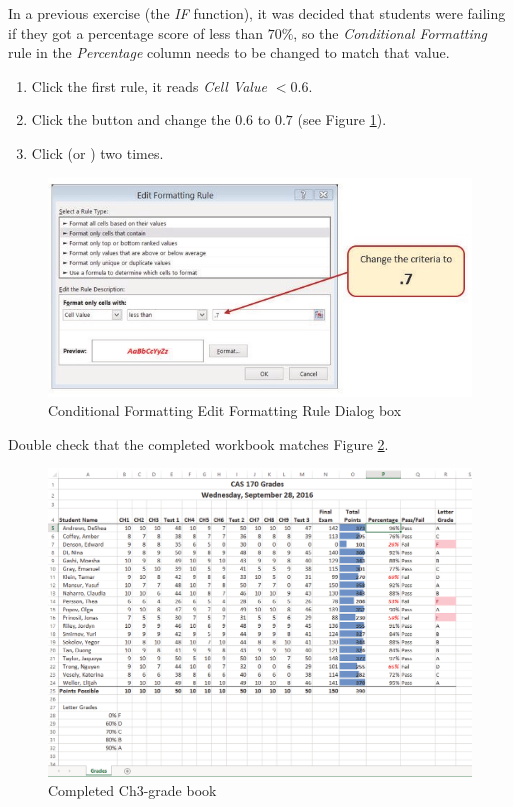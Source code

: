 In a previous exercise (the \textit{IF} function), it was decided that students were failing if they got a percentage score of less than $ 70\% $, so the \textit{Conditional Formatting} rule in the \textit{Percentage} column needs to be changed to match that value.

\begin{enumbox}
	\begin{enumerate}
		\item Click the first rule, it reads \textit{Cell Value $ <0.6 $}.
		\item Click the  button and change the $ 0.6 $ to $ 0.7 $ (see Figure \ref{03:fig24}).
		\item Click  (or ) two times.
	\end{enumerate}
\end{enumbox}
	
\begin{figure}[H]
	\centering
	\includegraphics[width=\maxwidth{.95\linewidth}]{gfx/ch03_fig24}
	\caption{Conditional Formatting Edit Formatting Rule Dialog box}
	\label{03:fig24}
\end{figure}

Double check that the completed workbook matches Figure \ref{03:fig25}.

\begin{figure}[H]
	\centering
	\includegraphics[width=\maxwidth{.95\linewidth}]{gfx/ch03_fig25}
	\caption{Completed Ch3-grade book}
	\label{03:fig25}
\end{figure}

